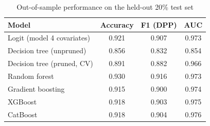 \begin{table}[htbp]
\centering
\caption{Out-of-sample performance on the held-out 20\% test set}
\label{tab:model_comparison}
\begin{tabular}{lccc}
\toprule
Model & Accuracy & F1 (DPP) & AUC \\
\midrule
Logit (model 4 covariates) & 0.921 & 0.907 & 0.973 \\
Decision tree (unpruned) & 0.856 & 0.832 & 0.854 \\
Decision tree (pruned, CV) & 0.891 & 0.882 & 0.966 \\
Random forest & 0.930 & 0.916 & 0.973 \\
Gradient boosting & 0.915 & 0.900 & 0.974 \\
XGBoost & 0.918 & 0.903 & 0.975 \\
CatBoost & 0.918 & 0.904 & 0.976 \\
\bottomrule
\end{tabular}
\end{table}
